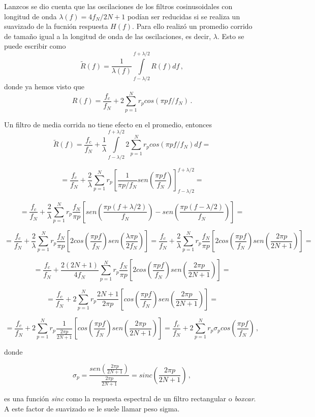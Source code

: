 \documentclass[
]{agujournal2019}
\begin{document}
Lanzcos se dio cuenta que las oscilaciones de los filtros cosinusoidales
con longitud de onda \(\lambda(f)=4f_N/2N+1\) podían ser reducidas si se
realiza un suavizado de la fucnión respuesta \(H(f)\). Para ello realizó
un promedio corrido de tamaño igual a la longitud de onda de las
oscilaciones, es decir, \(\lambda\). Esto se puede escribir como
\[\widetilde{R}(f)=\frac{1}{\lambda(f)}\int\limits^{f+\lambda/2}_{f-\lambda/2} R(f) d{f}\,,\]
donde ya hemos visto que \[R(f)=\frac{f_c}{f_N} + 2\sum\limits^{N}_{p=1}
r_p cos(\pi p f / f_N)\,.\]

Un filtro de media corrida no tiene efecto en el promedio, entonces
\[\widetilde{R}(f)=\frac{f_c}{f_N} + \frac{1}{\lambda}
\int\limits^{f+\lambda/2}_{f-\lambda/2} 2 \sum\limits^{N}_{p=1}
r_pcos(\pi p f / f_N)d{f}=\]

\[=\frac{f_c}{f_N} + \frac{2}{\lambda}\sum\limits^{N}_{p=1} r_p
\left[\frac{1}{\pi p /f_N} sen\left( \frac{\pi p
f}{f_N}\right)\right]^{f+\lambda/2}_{f-\lambda/2}=\]

\[=\frac{f_c}{f_N}+ \frac{2}{\lambda}\sum\limits^{N}_{p=1}
r_p\frac{f_N}{\pi p}\left[sen\left( \frac{\pi p
(f+\lambda/2)}{f_N}\right)-sen\left( \frac{\pi p
(f-\lambda/2)}{f_N}\right) \right]=\]

\[=\frac{f_c}{f_N}+ \frac{2}{\lambda}\sum\limits^{N}_{p=1}
r_p\frac{f_N}{\pi p}\left[2cos\left( \frac{\pi p
f}{f_N}\right)sen\left( \frac{\lambda \pi p}{2f_N}\right) \right]=
\frac{f_c}{f_N}+ \frac{2}{\lambda}\sum\limits^{N}_{p=1}
r_p\frac{f_N}{\pi p}\left[2cos\left( \frac{\pi p
f}{f_N}\right)sen\left( \frac{2 \pi p}{2N+1}\right) \right]=\]

\[=\frac{f_c}{f_N}+ \frac{2(2N+1)}{4f_N}\sum\limits^{N}_{p=1}
r_p\frac{f_N}{\pi p}\left[2cos\left( \frac{\pi p
f}{f_N}\right)sen\left( \frac{2 \pi p}{2N+1}\right) \right]=\]

\[=\frac{f_c}{f_N}+ 2\sum\limits^{N}_{p=1}
r_p\frac{2N+1}{2 \pi p}\left[cos\left( \frac{\pi p
f}{f_N}\right)sen\left( \frac{2 \pi p}{2N+1}\right) \right]=\]

\[=\frac{f_c}{f_N}+ 2\sum\limits^{N}_{p=1}
r_p\frac{1}{\frac{2 \pi p}{2N+1}}\left[cos\left( \frac{\pi p
f}{f_N}\right)sen\left( \frac{2 \pi p}{2N+1}\right) \right]=
\frac{f_c}{f_N}+ 2\sum\limits^{N}_{p=1}
r_p \sigma_p cos\left( \frac{\pi p
f}{f_N}\right)\,,\]

donde

\[\sigma_p=\frac{sen\left( \frac{2 \pi p}{2N+1}\right)}{\frac{2 \pi p}{2N+1}}= sinc\left(\frac{2 \pi p}{2N+1} \right)\,,\]

es una función \emph{sinc} como la respuesta espectral de un filtro
rectangular o \emph{boxcar}. A este factor de suavizado se le suele
llamar peso sigma.
\end{document}
